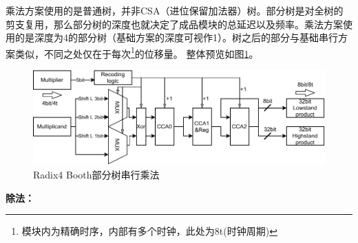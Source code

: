 \documentclass[UTF8,12pt,punct=kaiming,fontset=none]{article}
\begin{document}
    乘法方案使用的是普通树，并非CSA（进位保留加法器）树。部分树是对全树的剪支复用，那么部分树的深度也就决定了成品模块的总延迟以及频率。乘法方案使用的是深度为4的部分树（基础方案的深度可视作1）。树之后的部分与基础串行方案类似，不同之处仅在于每次\footnote{模块内为精确时序，内部有多个时钟，此处为8t(时钟周期)}的位移量。
    整体预览如图\ref{fig3}。
    \begin{figure}[H]
	    \centering
	    \includegraphics[scale=1]{hmul.pdf}
	    \caption{Radix4 Booth部分树串行乘法}
	    \label{fig3}
    \end{figure}

    \textbf{除法：}
\end{document}
